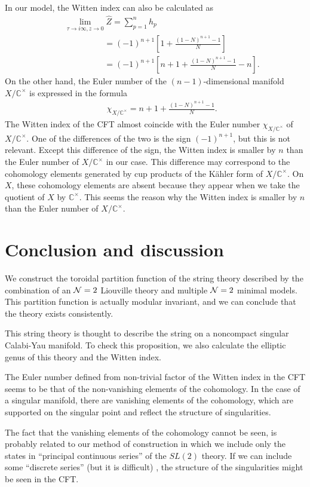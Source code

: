 \documentclass[a4paper,12pt]{article}
\numberwithin{equation}{section}
\newcommand{\Cx}{{\mathbb C}^{\times}}
\newcommand{\Ncal}{{\cal N}}
\newcommand{\Zh}{\hat{Z}}
\begin{document}
In our model, the Witten index can also be calculated as
\begin{eqnarray*}
 && \lim_{\tau\to i \infty,z\to 0}\Zh=\sum_{p=1}^{n} h_p\\
&&\hspace{2cm}=(-1)^{n+1}\left[1+\frac{(1-N)^{n+1}-1}{N}
\right]\\
&&\hspace{2cm}=(-1)^{n+1}\left[n+1+\frac{(1-N)^{n+1}-1}{N}-n\right].
\end{eqnarray*}
On the other hand, the Euler number of
the $(n-1)$-dimensional manifold $X/\Cx$ is expressed in the formula
\begin{eqnarray*}
 && \chi_{X/\Cx}=n+1+\frac{(1-N)^{n+1}-1}{N}.
\end{eqnarray*}
The Witten index of the CFT almost coincide with the Euler number
$\chi_{X/\Cx}$ of $X/\Cx$.
One of the differences of the two is the sign $(-1)^{n+1}$, but
this is not relevant. Except this difference of the sign, 
the Witten index is smaller by $n$ than the Euler number of $X/\Cx$
in our case. 
This difference may correspond to
the cohomology elements generated by cup products of the K\"ahler
form of $X/\Cx$. On $X$, these cohomology elements are absent because
they appear when we take the quotient of $X$ by $\Cx$. 
This seems the reason why the Witten index is smaller by $n$ than
the Euler number of $X/\Cx$.
\section{Conclusion and discussion}
We construct the toroidal partition function of the string theory
described by the combination of an $\Ncal=2$ Liouville theory
and multiple $\Ncal=2$ minimal models. 
This partition function is actually modular invariant, and we can conclude
that the theory exists consistently.

This string theory is thought to describe the string on
a noncompact singular Calabi-Yau manifold.
To check this proposition,
we also calculate the elliptic genus of this theory
and the Witten index.

The Euler number defined from
non-trivial factor of the Witten index in the CFT 
seems to be that of the non-vanishing 
elements of the cohomology.
In the case of a singular manifold, there are
vanishing elements of the cohomology, which are supported on
the singular point and reflect the structure of singularities.

The fact that
the vanishing elements of the cohomology cannot be seen,
is probably related
to our method of construction in which we include
only the states in ``principal continuous series'' of the
$SL(2)$ theory.
If we can include some ``discrete series''
(but it is difficult\cite{KS0001})
, the structure of the singularities
might be seen in the CFT.
\end{document}
